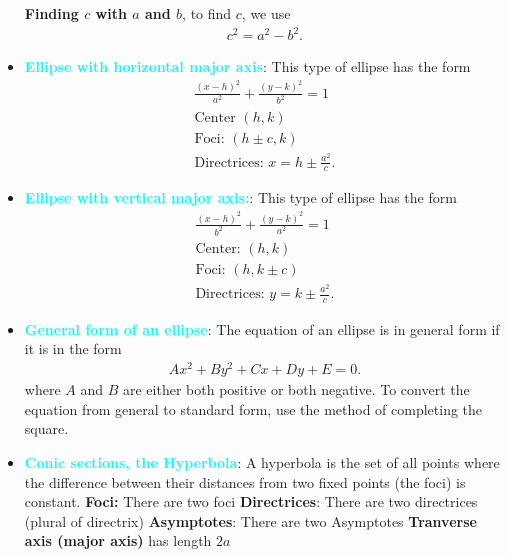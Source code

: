 \documentclass{report}
\begin{document}
\begin{itemize}
        \smallbreak \noindent
        \textbf{Finding $c$ with $a$ and $b$}, to find $c$, we use
        \begin{align*}
            c^{2} =  a^{2} - b^{2}
        .\end{align*}
    \item \textbf{\textcolor{cyan}{Ellipse with horizontal major axis}}: This type of ellipse has the form
        \begin{align*}
            \frac{(x-h)^{2}}{a^{2}} + \frac{(y-k)^{2}}{b^{2}} = 1 \\
            \text{Center } (h,k) \\
            \text{Foci: } (h\pm c, k) \\
            \text{Directrices: } x=h\pm \frac{a^{2}}{c}
        .\end{align*}
    \item \textbf{\textcolor{cyan}{Ellipse with vertical major axis:}}: This type of ellipse has the form
        \begin{align*}
             \frac{(x-h)^{2}}{b^{2}} + \frac{(y-k)^{2}}{a^{2}} = 1 \\
            \text{Center: } (h,k) \\
            \text{Foci: } (h, k\pm c) \\
            \text{Directrices: } y=k\pm \frac{a^{2}}{c}
        .\end{align*}
    \item \textbf{\textcolor{cyan}{General form of an ellipse}}: The equation of an ellipse is in general form if it is in the form
        \begin{align*}
            Ax^{2} +By^{2}   +Cx +Dy  +E = 0
        .\end{align*}
        where $A$ and $B$ are either both positive or both negative. To convert the equation from general to standard form, use the method of completing the square.
    \item \textbf{\textcolor{cyan}{Conic sections, the Hyperbola}}: A hyperbola is the set of all points where the difference between their distances from two fixed points (the foci) is constant.
        \bigbreak \noindent 
        \bigbreak \noindent 
        \textbf{Foci:} There are two foci
        \smallbreak \noindent
        \textbf{Directrices}: There are two directrices (plural of directrix)
        \smallbreak \noindent
        \textbf{Asymptotes}:  There are two Asymptotes
        \smallbreak \noindent
        \textbf{Tranverse axis (major axis)} has length $2a$

\end{itemize}
\end{document}
